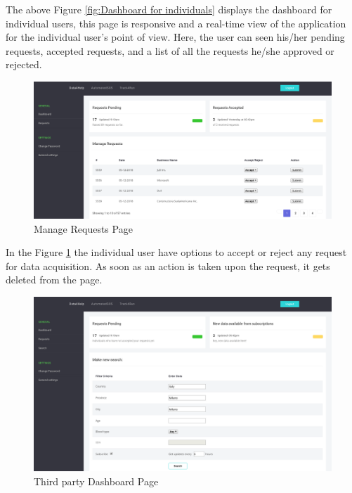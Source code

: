 \documentclass[a4paper, hidelinks, 12pt]{report}
\begin{document}
The above Figure \ref{fig:Dashboard for individuals} displays the dashboard for individual users, this page is responsive and a real-time view of the application for the individual user's point of view. Here, the user can seen his/her pending requests, accepted requests, and a list of all the requests he/she approved or rejected.

	\begin{figure}[H]
		\centering
		\includegraphics[width=1\textwidth]{UI/individual_manage_requests.png}
		\caption[UI: Manage Requests Page]{Manage Requests Page}
		\label{fig:manage_requests}
	\end{figure}

In the Figure \ref{fig:manage_requests} the individual user have options to accept or reject any request for data acquisition. As soon as an action is taken upon the request, it gets deleted from the page.

	\begin{figure}[H]
		\centering
		\includegraphics[width=1\textwidth]{UI/db_thirdparty.png}
		\caption[UI: Third party Dashboard Page]{Third party Dashboard Page}
		\label{fig:third_party_dashboard}
	\end{figure}
	
\end{document}
